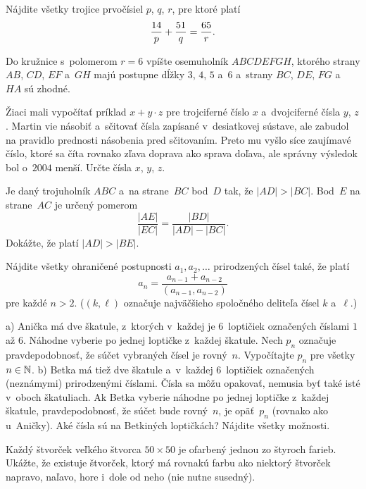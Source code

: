 {%
Nájdite všetky trojice prvočísiel $p$, $q$, $r$, pre ktoré platí
$$
{14\over p}+{51\over q}={65\over r}.
$$}

{%
Do kružnice s~polomerom $r=6$ vpíšte osemuholník $ABCDEFGH$,
ktorého strany $AB$, $CD$, $EF$ a~$GH$ majú postupne dĺžky $3$, $4$, $5$
a~$6$ a~strany $BC$, $DE$, $FG$ a~$HA$ sú zhodné.}

{%
Žiaci mali vypočítať príklad $x+y\cdot z$ pre trojciferné číslo
$x$ a~dvojciferné čísla $y$, $z$. Martin vie násobiť a~sčitovať
čísla zapísané v~desiatkovej sústave, ale zabudol na pravidlo
prednosti násobenia pred sčitovaním. Preto mu vyšlo síce zaujímavé
číslo, ktoré sa číta rovnako zľava doprava ako sprava doľava,
ale správny výsledok bol o~$2004$ menší. Určte čísla $x$, $y$, $z$.}

{%
Je daný trojuholník $ABC$ a~na strane~$BC$ bod~$D$ tak, že $|AD|>|BC|$. Bod~$E$ na strane~$AC$ je určený pomerom
$$
\frac{|AE|}{|EC|}=\frac{|BD|}{|AD|-|BC|}.
$$
Dokážte, že platí $|AD|>|BE|$.}

{%
Nájdite všetky ohraničené postupnosti $a_1, a_2, \dots$ prirodzených čísel také, že platí
$$
a_n = \frac{a_{n-1}+a_{n-2}}{(a_{n-1},a_{n-2})}
$$
pre každé $n>2$. ($(k,\ell)$ označuje najväčšieho spoločného deliteľa čísel $k$ a~$\ell$.)}

{%
\ite a) Anička má dve škatule, z~ktorých v~každej je 6~loptičiek označených číslami $1$ až $6$. Náhodne vyberie po jednej loptičke z~každej škatule. Nech $p_n$ označuje pravdepodobnosť, že súčet vybraných čísel je rovný~$n$. Vypočítajte $p_n$ pre všetky $n\in\Bbb{N}$.
\ite b) Betka má tiež dve škatule a~v~každej 6~loptičiek označených (neznámymi) prirodzenými číslami. Čísla sa môžu opakovať, nemusia byť také isté v~oboch škatuliach. Ak Betka vyberie náhodne po jednej loptičke z~každej škatule, pravdepodobnosť, že súčet bude rovný~$n$, je opäť~$p_n$ (rovnako ako u~Aničky). Aké čísla sú na Betkiných loptičkách? Nájdite všetky možnosti.}

{%
Každý štvorček veľkého štvorca $50\times 50$ je ofarbený jednou zo štyroch farieb. Ukážte, že existuje štvorček, ktorý má rovnakú farbu ako niektorý štvorček napravo, naľavo, hore i~dole od neho (nie nutne susedný).}

